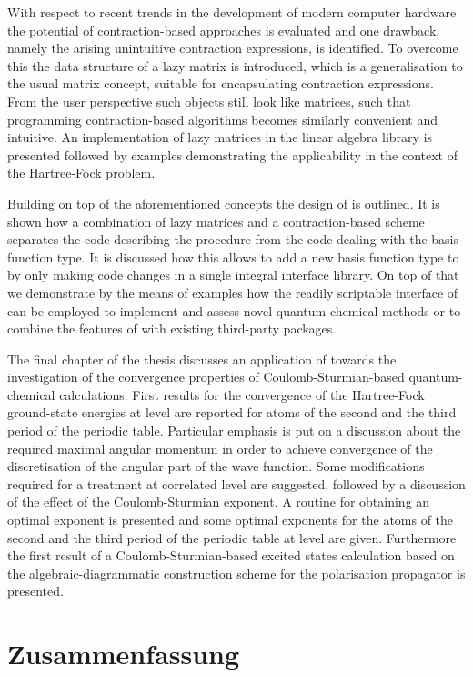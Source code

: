 With respect to recent trends in the development of modern computer hardware
the potential of contraction-based approaches is evaluated
and one drawback,
namely the arising unintuitive contraction expressions,
is identified.
To overcome this the data structure of a lazy matrix is introduced,
which is a generalisation to the usual matrix concept,
suitable for encapsulating contraction expressions.
From the user perspective such objects still look like matrices,
such that programming contraction-based algorithms
becomes similarly convenient and intuitive.
An implementation of lazy matrices in the \lazyten linear algebra library
is presented followed by examples
demonstrating the applicability in the context of the Hartree-Fock problem.

Building on top of the aforementioned concepts the design of \molsturm is outlined.
It is shown how a combination of lazy matrices and a contraction-based \SCF scheme
separates the code describing the \SCF procedure
from the code dealing with the basis function type.
It is discussed how this allows to add a new basis function type
to \molsturm by only making code changes in a single integral interface library.
On top of that we demonstrate by the means of examples
how the readily scriptable interface of \molsturm
can be employed to implement and assess novel quantum-chemical methods
or to combine the features of \molsturm with existing third-party packages.

The final chapter of the thesis discusses an application of \molsturm
towards the investigation of the convergence properties
of Coulomb-Sturmian-based quantum-chemical calculations.
First results for the convergence
of the Hartree-Fock ground-state energies at \HF level
are reported for atoms of the second and the third period
of the periodic table.
Particular emphasis is put on a discussion about the required
maximal angular momentum in order to achieve convergence
of the discretisation of the angular part of the wave function.
Some modifications required for a treatment at correlated level are suggested,
followed by a discussion of the effect of the Coulomb-Sturmian exponent.
A routine for obtaining an optimal exponent is presented
and some optimal exponents for the atoms of the
second and the third period of the periodic table at \HF level are given.
Furthermore the first result of a Coulomb-Sturmian-based excited
states calculation based on the algebraic-diagrammatic construction
scheme for the polarisation propagator is presented.


%
%
\chapter*{Zusammenfassung}
